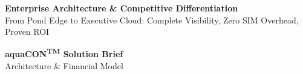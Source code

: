 \documentclass[10pt,a4paper]{article}
\begin{document}
\begin{tcolorbox}[
  enhanced,
  colback=NavyPrimary,
  colframe=NavyPrimary,
  colupper=white,
  arc=2.5mm,
  boxrule=0pt,
  left=14pt, right=14pt, top=8pt, bottom=8pt
]
  \begin{minipage}[c]{0.70\linewidth}
    {\fontsize{13.5}{16.5}\selectfont \textbf{Enterprise Architecture \& Competitive Differentiation}}\\[2.5pt]
    {\fontsize{8.5}{11}\selectfont \textcolor{CyanAccent}{From Pond Edge to Executive Cloud: Complete Visibility, Zero SIM Overhead, Proven ROI}}
  \end{minipage}\hfill
  \begin{minipage}[c]{0.28\linewidth}
    \raggedleft
    {\fontsize{9.5}{11.5}\selectfont \textbf{aquaCON\textsuperscript{\tiny TM} Solution Brief}}\\[1pt]
    {\fontsize{7.5}{9}\selectfont \textcolor{BorderLight}{Architecture \& Financial Model}}
  \end{minipage}
\end{tcolorbox}

\vspace{5pt}
\end{document}
